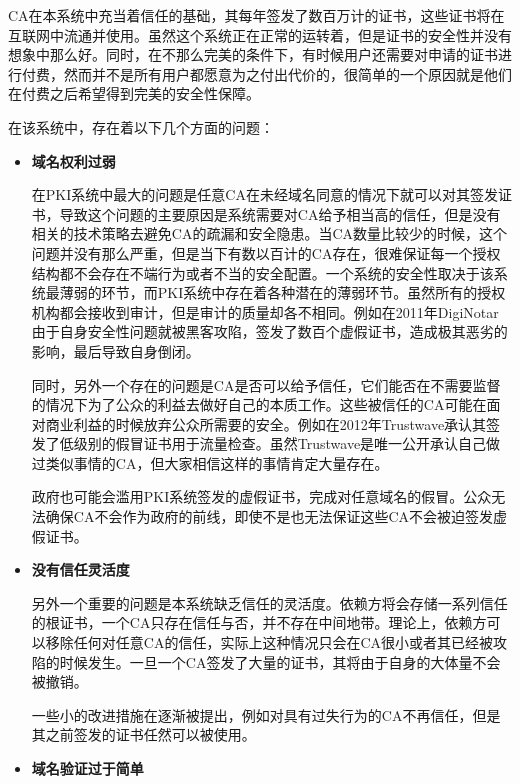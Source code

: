 CA在本系统中充当着信任的基础，其每年签发了数百万计的证书，这些证书将在互联网中流通并使用。虽然这个系统正在正常的运转着，但是证书的安全性并没有想象中那么好。同时，在不那么完美的条件下，有时候用户还需要对申请的证书进行付费，然而并不是所有用户都愿意为之付出代价的，很简单的一个原因就是他们在付费之后希望得到完美的安全性保障。

在该系统中，存在着以下几个方面的问题\supercite{ristic2014bulletproof}：


\begin{itemize}
	\item

	\noindent\textbf{域名权利过弱}

	在PKI系统中最大的问题是任意CA在未经域名同意的情况下就可以对其签发证书，导致这个问题的主要原因是系统需要对CA给予相当高的信任，但是没有相关的技术策略去避免CA的疏漏和安全隐患。当CA数量比较少的时候，这个问题并没有那么严重，但是当下有数以百计的CA存在，很难保证每一个授权结构都不会存在不端行为或者不当的安全配置。一个系统的安全性取决于该系统最薄弱的环节，而PKI系统中存在着各种潜在的薄弱环节。虽然所有的授权机构都会接收到审计，但是审计的质量却各不相同。例如在2011年DigiNotar由于自身安全性问题就被黑客攻陷，签发了数百个虚假证书，造成极其恶劣的影响，最后导致自身倒闭。

	同时，另外一个存在的问题是CA是否可以给予信任，它们能否在不需要监督的情况下为了公众的利益去做好自己的本质工作。这些被信任的CA可能在面对商业利益的时候放弃公众所需要的安全。例如在2012年Trustwave承认其签发了低级别的假冒证书用于流量检查。虽然Trustwave是唯一公开承认自己做过类似事情的CA，但大家相信这样的事情肯定大量存在。

	政府也可能会滥用PKI系统签发的虚假证书，完成对任意域名的假冒。公众无法确保CA不会作为政府的前线，即使不是也无法保证这些CA不会被迫签发虚假证书。



	\item

	\noindent\textbf{没有信任灵活度}

	另外一个重要的问题是本系统缺乏信任的灵活度。依赖方将会存储一系列信任的根证书，一个CA只存在信任与否，并不存在中间地带。理论上，依赖方可以移除任何对任意CA的信任，实际上这种情况只会在CA很小或者其已经被攻陷的时候发生。一旦一个CA签发了大量的证书，其将由于自身的大体量不会被撤销。

	一些小的改进措施在逐渐被提出，例如对具有过失行为的CA不再信任，但是其之前签发的证书任然可以被使用。

	\item

	\noindent\textbf{域名验证过于简单}


\end{itemize}

